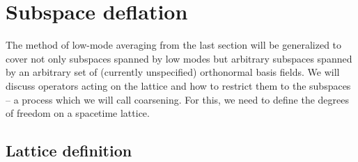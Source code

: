 \chapter{Subspace deflation}
\label{ch:p2:subspace-deflation}



The method of low-mode averaging from the last section will be generalized to cover not only subspaces spanned by low modes but arbitrary subspaces spanned by an arbitrary set of (currently unspecified) orthonormal basis fields.
We will discuss operators acting on the lattice and how to restrict them to the subspaces -- a process which we will call coarsening.
For this, we need to define the degrees of freedom on a spacetime lattice.


\section{Lattice definition}
\label{sec:lattice:definition}

